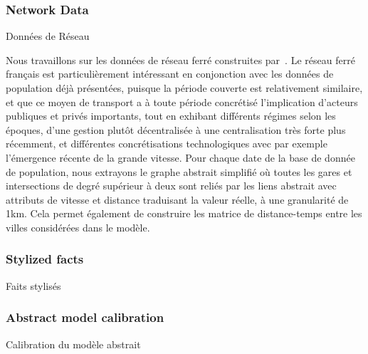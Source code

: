 


\subsubsection{Network Data}{Données de Réseau}

Nous travaillons sur les données de réseau ferré construites par~\cite{thevenin2013mapping}. Le réseau ferré français est particulièrement intéressant en conjonction avec les données de population déjà présentées, puisque la période couverte est relativement similaire, et que ce moyen de transport a à toute période concrétisé l'implication d'acteurs publiques et privés importants, tout en exhibant différents régimes selon les époques, d'une gestion plutôt décentralisée à une centralisation très forte plus récemment, et différentes concrétisations technologiques avec par exemple l'émergence récente de la grande vitesse. Pour chaque date de la base de donnée de population, nous extrayons le graphe abstrait simplifié où toutes les gares et intersections de degré supérieur à deux sont reliés par les liens abstrait avec attributs de vitesse et distance traduisant la valeur réelle, à une granularité de 1km. Cela permet également de construire les matrice de distance-temps entre les villes considérées dans le modèle.



\subsubsection{Stylized facts}{Faits stylisés}









\subsubsection{Abstract model calibration}{Calibration du modèle abstrait}




